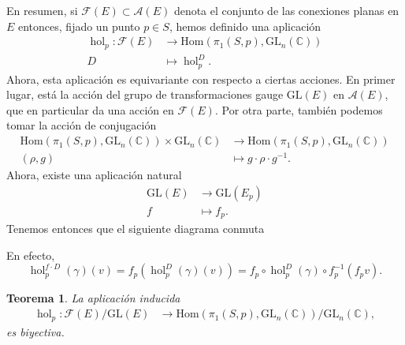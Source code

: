 \documentclass[12pt,a4paper]{article}
\newtheorem{thm}{Teorema}[section]
\theoremstyle{definition} \newtheorem{defn}[thm]{Definición}
\theoremstyle{definition} \newtheorem{ejemplo}[thm]{Ejemplo}
\theoremstyle{definition} \newtheorem{ejercicio}[thm]{Ejercicio}
\def\CC{\mathbb{C}}
\def\GL{\mathrm{GL}}
\DeclareMathOperator{\hol}{hol}
\begin{document}
	  En resumen, si $\mathcal{F}(E)\subset \mathcal{A}(E)$ denota el conjunto de las conexiones planas en $E$ entonces, fijado un punto $p\in S$, hemos definido una aplicación
	  \begin{align*}
	    \hol_p: \mathcal{F}(E) & \longrightarrow \mathrm{Hom}(\pi_1(S,p), \GL_n(\CC)) \\
	      D &\longmapsto  \hol_p^D.
	    \end{align*}
	    Ahora, esta aplicación es equivariante con respecto a ciertas acciones. En primer lugar, está la acción del grupo de transformaciones gauge $\GL(E)$ en $\mathcal{A}(E)$, que en particular da una acción en $\mathcal{F}(E)$. Por otra parte, también podemos tomar la acción de conjugación 
	    \begin{align*}
	      \mathrm{Hom}(\pi_1(S,p),\GL_n(\CC)) \times \GL_n(\CC) &\longrightarrow \mathrm{Hom}(\pi_1(S,p),\GL_n(\CC))\\ 
	      (\rho,g) &\longmapsto g \cdot \rho \cdot g^{-1}.
	      \end{align*}
	      Ahora, existe una aplicación natural 
	      \begin{align*}
		 \GL(E)&\longrightarrow \GL(E_p)\\ 
		  f &\longmapsto f_p. 
		\end{align*}
		Tenemos entonces que el siguiente diagrama conmuta
		\begin{center}
		 \end{center}
		 En efecto, 
		 \begin{equation*}
		   \hol_p^{f\cdot D}(\gamma) (v) = f_p(\hol_p^D(\gamma) (v)) = f_p \circ \hol_p^D(\gamma) \circ f_p^{-1} (f_p v) .
		 \end{equation*}
		
		 \begin{thm}
		   La aplicación inducida 
		   \begin{align*}
		     \hol_p :\mathcal{F}(E)/ \GL(E) &\longrightarrow \mathrm{Hom}(\pi_1(S,p),\GL_n(\CC))/\GL_n(\CC),
		     \end{align*}
		     es biyectiva.
		 \end{thm}
\end{document}

